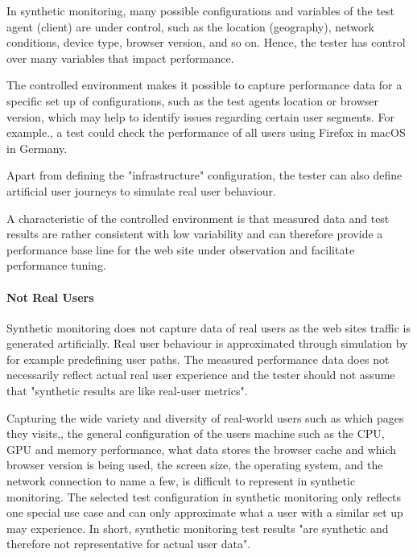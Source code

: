 In synthetic monitoring, many possible configurations and variables of the test agent (client) are under control, such as the location (geography), network conditions, device type, browser version, and so on. %
Hence, the tester has control over many variables that impact performance.

The controlled environment makes it possible to capture performance data for a specific set up of configurations, such as the test agents location or browser version, which may help to identify issues regarding certain user segments.  For example., a test could check the performance of all users using Firefox in macOS in Germany. %

Apart from defining the "infrastructure" configuration, the tester can also define artificial user journeys to simulate real user behaviour. %

A characteristic of the controlled environment is that measured data and test results are rather consistent with low variability and can therefore provide a performance base line for the web site under observation and facilitate performance tuning.%


\paragraph{Not Real Users}

Synthetic monitoring does not capture data of real users as the web sites traffic is generated artificially.
Real user behaviour is approximated through simulation by for example predefining user paths.
The measured performance data does not necessarily reflect actual real user experience and the tester should not assume that "synthetic results are like real-user metrics". %

Capturing the wide variety and diversity of real-world users such as which pages they visits,, the general configuration of the users machine such as the CPU, GPU and memory performance, what data stores the browser cache and which browser version is being used, the screen size, the operating system, and the network connection to name a few, is difficult to represent in synthetic monitoring. %
The selected test configuration in synthetic monitoring only reflects one special use case and can only approximate what a user with a similar set up may experience. %
In short, synthetic monitoring test results "are synthetic and therefore not representative for actual user data".  %



